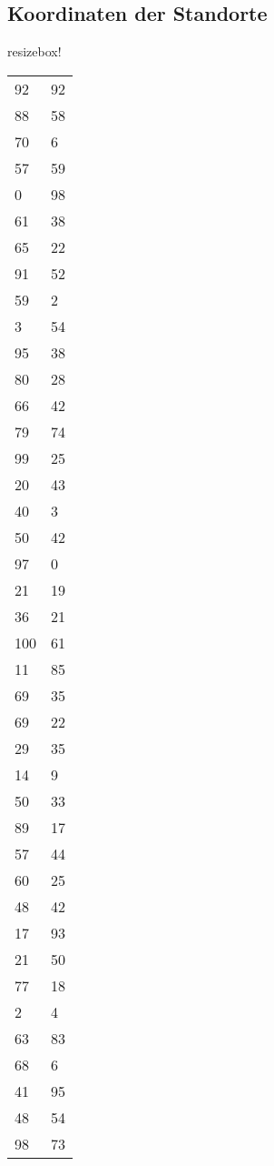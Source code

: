 \documentclass{IEEEtran}
\begin{document}
\subsection{Koordinaten der Standorte}
\begin{table}[]
    resizebox{\textwidth}{!}\begin{tabular}{ll}
    92  & 92 \\
    88  & 58 \\
    70  & 6  \\
    57  & 59 \\
    0   & 98 \\
    61  & 38 \\
    65  & 22 \\
    91  & 52 \\
    59  & 2  \\
    3   & 54 \\
    95  & 38 \\
    80  & 28 \\
    66  & 42 \\
    79  & 74 \\
    99  & 25 \\
    20  & 43 \\
    40  & 3  \\
    50  & 42 \\
    97  & 0  \\
    21  & 19 \\
    36  & 21 \\
    100 & 61 \\
    11  & 85 \\
    69  & 35 \\
    69  & 22 \\
    29  & 35 \\
    14  & 9  \\
    50  & 33 \\
    89  & 17 \\
    57  & 44 \\
    60  & 25 \\
    48  & 42 \\
    17  & 93 \\
    21  & 50 \\
    77  & 18 \\
    2   & 4  \\
    63  & 83 \\
    68  & 6  \\
    41  & 95 \\
    48  & 54 \\
    98  & 73 \\

\end{tabular}
\end{table}
\end{document}
